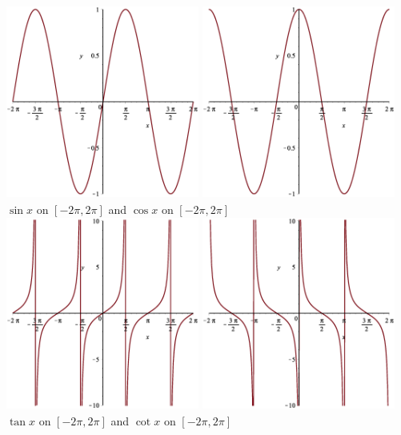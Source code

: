 \documentclass[oneside]{article}
\begin{document}
\begin{center}
\includegraphics[width=2.5in, height=2.5in]{img/sinx.eps}
\includegraphics[width=2.5in, height=2.5in]{img/cosx.eps} \\
$\sin{x}$ on $[-2\pi,2\pi]$ and $\cos{x}$ on $[-2\pi,2\pi]$ \\

\includegraphics[width=2.5in, height=2.5in]{img/tanx.eps}
\includegraphics[width=2.5in, height=2.5in]{img/cotx.eps} \\
$\tan{x}$ on $[-2\pi,2\pi]$ and $\cot{x}$ on $[-2\pi,2\pi]$ \\


\end{center}
\end{document}
